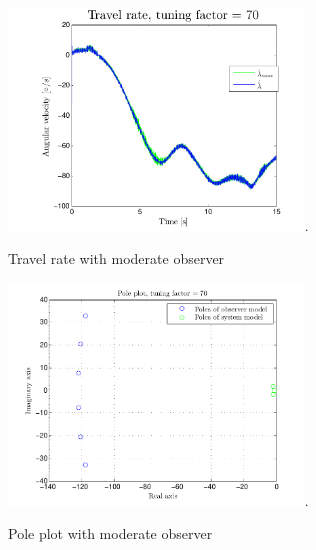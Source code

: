 \begin{figure}[htb]
	\centering
		\includegraphics[width=0.7\textwidth,trim={0cm 0cm 0cm 0cm},clip]{figures/P4p2_travel_rate_tuning_factor_70.pdf}.
	\caption{Travel rate with moderate observer}
\label{fig:P4p2_travel_rate_70}
\end{figure}
\begin{figure}[htb]
	\centering
		\includegraphics[width=0.7\textwidth,trim={0cm 0cm 0cm 0cm},clip]{figures/P4p2_pole_plot_tuning_factor_70.pdf}.
	\caption{Pole plot with moderate observer}
\label{fig:P4p2_pole_plot_70}
\end{figure}
